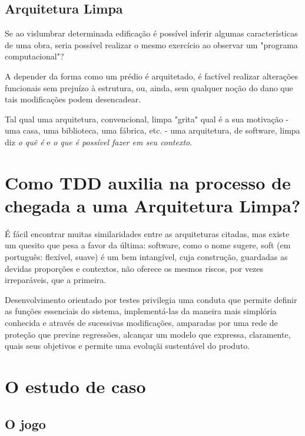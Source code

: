     \subsection{Arquitetura Limpa}

      Se ao vislumbrar determinada edificação é possível inferir algumas
      características de uma obra, seria possível realizar o mesmo exercício ao
      observar um "programa computacional"?

      A depender da forma como um prédio é arquitetado, é factível realizar
      alterações funcionais sem prejuízo à estrutura, ou, ainda, sem qualquer
      noção do dano que tais modificações podem desencadear.

      Tal qual uma arquitetura, convencional, limpa "grita"\cite[p. 196]{
      Martin2018} qual é a sua motivação - uma casa, uma biblioteca, uma fábrica,
      etc. - uma arquitetura, de software,  limpa diz \emph{o quê é} e \emph{o
      que é possível fazer em seu contexto}.


  \section{Como TDD auxilia na processo de chegada a uma Arquitetura Limpa?}

    É fácil encontrar muitas similaridades entre as arquiteturas citadas, mas
    existe um quesito que pesa a favor da última: software, como o nome sugere,
    soft (em português: flexível, suave) é um bem intangível, cuja construção,
    guardadas as devidas proporções e contextos, não oferece os mesmos riscos,
    por vezes irreparáveis, que a primeira.

    Desenvolvimento orientado por testes privilegia uma conduta que permite
    definir as funções essenciais do sistema, implementá-las da maneira mais
    simplória conhecida e através de sucessivas modificações, amparadas por uma
    rede de proteção que previne regressões, alcançar um modelo que expressa,
    claramente, quais seus objetivos e permite uma evoluçãi sustentável do
    produto.


  \section{O estudo de caso}

    \subsection{O jogo}

